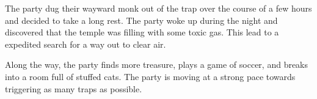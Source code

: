 The party dug their wayward monk out of the trap over the course of a few hours and decided to take a long rest.
The party woke up during the night and discovered that the temple was filling with some toxic gas.
This lead to a expedited search for a way out to clear air.

Along the way, the party finds more treasure, plays a game of soccer, and breaks into a room full of stuffed cats.
The party is moving at a strong pace towards triggering as many traps as possible.
